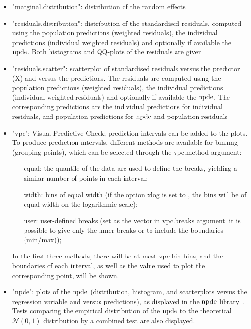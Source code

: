 \begin{itemize}
\item "marginal.distribution": distribution of the random effects
\item "residuals.distribution": distribution of the standardised residuals, computed using the population predictions (weighted residuals), the individual predictions (individual weighted residuals) and optionally if available the ${\rm npde}$. Both histograms and QQ-plots of the residuals are given
\item "residuals.scatter": scatterplot of standardised residuals versus the predictor (X) and versus the predictions. The residuals are computed using the population predictions (weighted residuals), the individual predictions (individual weighted residuals) and optionally if available the ${\rm npde}$. The corresponding predictions are the individual predictions for individual residuals, and population predictions for ${\rm npde}$ and population residuals
\item "vpc": Visual Predictive Check; prediction intervals can be added to the plots. To produce prediction intervals, different methods are available for binning (grouping points), which can be selected through the {\sf vpc.method} argument:
\begin{itemize}
\item[{\sf equal}:] the quantile of the data are used to define the breaks, yielding a similar number of points in each interval;
\item[{\sf width}:] bins of equal width (if the option {\sf xlog} is set to \true, the bins will be of equal width on the logarithmic scale);
\item[{\sf user}:] user-defined breaks (set as the vector in {\sf vpc.breaks} argument; it is possible to give only the inner breaks or to include the boundaries (min/max));
\end{itemize}
In the first three methods, there will be at most {\sf vpc.bin} bins, and the boundaries of each interval, as well as the value used to plot the corresponding point, will be shown.
\item "npde": plots of the ${\rm npde}$ (distribution, histogram, and scatterplots versus the regression variable and versus predictions), as displayed in the ${\rm npde}$ library~\cite{CometsCMPB08}. Tests comparing the empirical distribution of the ${\rm npde}$ to the theoretical $\mathcal{N}(0,1)$ distribution by a combined test are also displayed.
\end{itemize}
